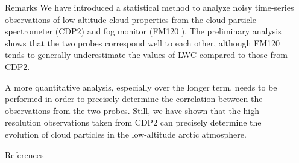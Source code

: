 \documentclass[final]{beamer}
\newlength{\sepwidth}
\newlength{\colwidth}
\newcommand{\separatorcolumn}{\begin{column}{\sepwidth}\end{column}}
\begin{document}
\begin{frame}[t]
\begin{columns}[t]
\begin{column}{\colwidth}
  \begin{block}{Remarks}
    We have introduced a statistical method to analyze noisy time-series observations of low-altitude cloud properties from the cloud particle spectrometer (CDP2) and fog monitor (FM120 \cite{karl2020ro,koik2019ye}). The preliminary analysis shows that the two probes correspond well to each other, although FM120 tends to generally underestimate the values of LWC compared to those from CDP2.

    A more quantitative analysis, especially over the longer term, needs to be performed in order to precisely determine the correlation between the observations from the two probes. Still, we have shown that the high-resolution observations taken from CDP2 can precisely determine the evolution of cloud particles in the low-altitude arctic atmosphere.
  \end{block}

  \begin{block}{References}
    \nocite{*}
    \footnotesize{}
  \end{block}

\end{column}

\separatorcolumn
\end{columns}
\end{frame}
\end{document}
